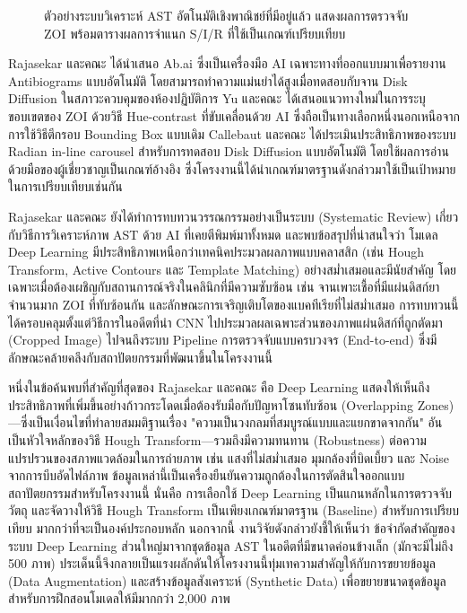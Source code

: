 \begin{figure}[H]
  \centering
  \caption{ตัวอย่างระบบวิเคราะห์ AST อัตโนมัติเชิงพาณิชย์ที่มีอยู่แล้ว แสดงผลการตรวจจับ
    ZOI พร้อมตารางผลการจำแนก S/I/R ที่ใช้เป็นเกณฑ์เปรียบเทียบ \cite{rajasekar2023}}
  \label{fig:related_existing}
\end{figure}
Rajasekar และคณะ \cite{rajasekar2022} ได้นำเสนอ Ab.ai ซึ่งเป็นเครื่องมือ AI เฉพาะทางที่ออกแบบมาเพื่อรายงาน Antibiograms แบบอัตโนมัติ โดยสามารถทำความแม่นยำได้สูงเมื่อทดสอบกับจาน Disk Diffusion ในสภาวะควบคุมของห้องปฏิบัติการ
Yu และคณะ \cite{yu2025} ได้เสนอแนวทางใหม่ในการระบุขอบเขตของ ZOI ด้วยวิธี Hue-contrast ที่ขับเคลื่อนด้วย AI ซึ่งถือเป็นทางเลือกหนึ่งนอกเหนือจากการใช้วิธีตีกรอบ Bounding Box แบบเดิม
Callebaut และคณะ \cite{callebaut2024} ได้ประเมินประสิทธิภาพของระบบ Radian\textregistered{} in-line carousel สำหรับการทดสอบ Disk Diffusion แบบอัตโนมัติ โดยใช้ผลการอ่านด้วยมือของผู้เชี่ยวชาญเป็นเกณฑ์อ้างอิง ซึ่งโครงงานนี้ได้นำเกณฑ์มาตรฐานดังกล่าวมาใช้เป็นเป้าหมายในการเปรียบเทียบเช่นกัน

Rajasekar และคณะ \cite{rajasekar2023} ยังได้ทำการทบทวนวรรณกรรมอย่างเป็นระบบ (Systematic Review) เกี่ยวกับวิธีการวิเคราะห์ภาพ AST ด้วย AI ที่เคยตีพิมพ์มาทั้งหมด และพบข้อสรุปที่น่าสนใจว่า โมเดล Deep Learning มีประสิทธิภาพเหนือกว่าเทคนิคประมวลผลภาพแบบคลาสสิก (เช่น Hough Transform, Active Contours และ Template Matching) อย่างสม่ำเสมอและมีนัยสำคัญ โดยเฉพาะเมื่อต้องเผชิญกับสถานการณ์จริงในคลินิกที่มีความซับซ้อน เช่น จานเพาะเชื้อที่มีแผ่นดิสก์ยาจำนวนมาก ZOI ที่ทับซ้อนกัน และลักษณะการเจริญเติบโตของแบคทีเรียที่ไม่สม่ำเสมอ การทบทวนนี้ได้ครอบคลุมตั้งแต่วิธีการในอดีตที่นำ CNN ไปประมวลผลเฉพาะส่วนของภาพแผ่นดิสก์ที่ถูกตัดมา (Cropped Image) ไปจนถึงระบบ Pipeline การตรวจจับแบบครบวงจร (End-to-end) ซึ่งมีลักษณะคล้ายคลึงกับสถาปัตยกรรมที่พัฒนาขึ้นในโครงงานนี้

หนึ่งในข้อค้นพบที่สำคัญที่สุดของ Rajasekar และคณะ คือ Deep Learning แสดงให้เห็นถึงประสิทธิภาพที่เพิ่มขึ้นอย่างก้าวกระโดดเมื่อต้องรับมือกับปัญหาโซนทับซ้อน (Overlapping Zones)---ซึ่งเป็นเงื่อนไขที่ทำลายสมมติฐานเรื่อง "ความเป็นวงกลมที่สมบูรณ์แบบและแยกขาดจากกัน" อันเป็นหัวใจหลักของวิธี Hough Transform---รวมถึงมีความทนทาน (Robustness) ต่อความแปรปรวนของสภาพแวดล้อมในการถ่ายภาพ เช่น แสงที่ไม่สม่ำเสมอ มุมกล้องที่บิดเบี้ยว และ Noise จากการบีบอัดไฟล์ภาพ \cite{rajasekar2023} ข้อมูลเหล่านี้เป็นเครื่องยืนยันความถูกต้องในการตัดสินใจออกแบบสถาปัตยกรรมสำหรับโครงงานนี้ นั่นคือ การเลือกใช้ Deep Learning เป็นแกนหลักในการตรวจจับวัตถุ และจัดวางให้วิธี Hough Transform เป็นเพียงเกณฑ์มาตรฐาน (Baseline) สำหรับการเปรียบเทียบ มากกว่าที่จะเป็นองค์ประกอบหลัก นอกจากนี้ งานวิจัยดังกล่าวยังชี้ให้เห็นว่า ข้อจำกัดสำคัญของระบบ Deep Learning ส่วนใหญ่มาจากชุดข้อมูล AST ในอดีตที่มีขนาดค่อนข้างเล็ก (มักจะมีไม่ถึง 500 ภาพ) ประเด็นนี้จึงกลายเป็นแรงผลักดันให้โครงงานนี้ทุ่มเทความสำคัญให้กับการขยายข้อมูล (Data Augmentation) และสร้างข้อมูลสังเคราะห์ (Synthetic Data) เพื่อขยายขนาดชุดข้อมูลสำหรับการฝึกสอนโมเดลให้มีมากกว่า 2,000 ภาพ

